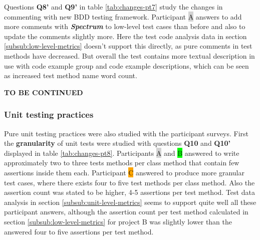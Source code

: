 Questions \textbf{Q8'} and \textbf{Q9'} in table \ref{tab:changes-pt7} study the changes in commenting with new BDD testing framework.
Participant {\colorbox{lightgray}A} answers to add more comments with \textbf{\textit{Spectrum}} to low-level test cases
than before and also to update the comments slightly more.
Here the test code analysis data in section \ref{subsub:low-level-metrics} doesn't support this directly, as pure comments
in test methods have decreased. But overall
the test contains more textual description in use with code example group and code example descriptions, which can be seen
as increased test method name word count.

\textbf{TO BE CONTINUED}
\clearpage
\subsubsection{Unit testing practices}
Pure unit testing practices were also studied with the participant surveys. First the \textbf{granularity} of unit tests were
studied with questions \textbf{Q10} and \textbf{Q10'} displayed in table \ref{tab:changes-pt8}. Participants {\colorbox{lightgray}A} and {\colorbox{lime}B} answered
to write approximately two to three tests methods per class method that contain few assertions inside them each. Participant
{\colorbox{orange}C} answered to produce more granular test cases, where there exists four to five test methods per class method.
Also the assertion count was stated to be higher, 4-5 assertions per test method. Test data analysis in section \ref{subsub:unit-level-metrics}
seems to support quite well all these participant answers, although the assertion count per test method calculated in section \ref{subsub:low-level-metrics}
for project B was slightly lower than the answered four to five assertions per test method.

